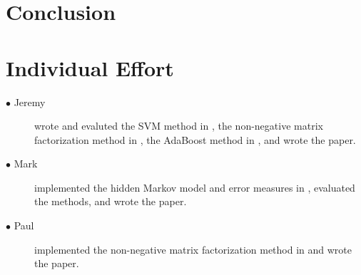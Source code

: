\documentclass[5p]{elsarticle}
\begin{document}
\section{Conclusion}





\section{Individual Effort}
\begin{description}
\item[$\bullet$ Jeremy] wrote and evaluted the SVM method in \citet{poliner2006discriminative}, the non-negative matrix factorization method in \citet{abdallah2004polyphonic}, the AdaBoost method in \citet{boogaart2009note}, and wrote the paper.
\item[$\bullet$ Mark] implemented the hidden Markov model and error measures in \citet{poliner2006discriminative}, evaluated the methods, and wrote the paper.
\item[$\bullet$ Paul] implemented the non-negative matrix factorization method in \citet{abdallah2004polyphonic} and wrote the paper.
\end{description}
\end{document}
